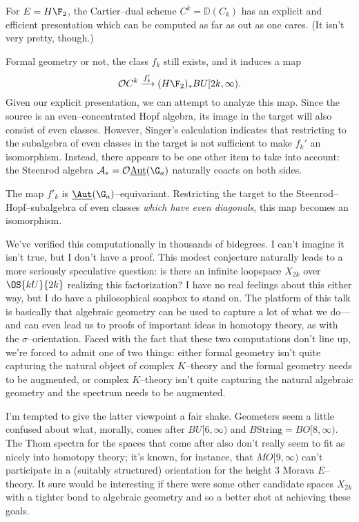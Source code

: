 \begin{theorem}
For $E = H\F_2$, the Cartier--dual scheme $C^k = \mathbb{D}(C_k)$ has an explicit and efficient presentation which can be computed as far as out as one cares.  (It isn't very pretty, though.)
\end{theorem}

Formal geometry or not, the class $f_k$ still exists, and it induces a map \[\mathcal{O} C^k \xrightarrow{f_k'} (H\F_2)_* BU[2k, \infty).\]  Given our explicit presentation, we can attempt to analyze this map.  Since the source is an even--concentrated Hopf algebra, its image in the target will also consist of even classes.  However, Singer's calculation indicates that restricting to the subalgebra of even classes in the target is not sufficient to make $f_k'$ an isomorphism.  Instead, there appears to be one other item to take into account: the Steenrod algebra $\mathcal{A}_* = \mathcal{O} \underline{\operatorname{Aut}}(\G_a)$ naturally coacts on both sides.

\begin{conjecture}
The map $f'_k$ is $\underline{\Aut}(\G_a)$--equivariant.  Restricting the target to the Steenrod--Hopf--subalgebra of even classes \emph{which have even diagonals}, this map becomes an isomorphism.
\end{conjecture}

\noindent We've verified this computationally in thousands of bidegrees.  I can't imagine it isn't true, but I don't have a proof.  This modest conjecture naturally leads to a more seriously speculative question: is there an infinite loopspace $X_{2k}$ over $\OS{kU}{2k}$ realizing this factorization?  I have no real feelings about this either way, but I do have a philosophical soapbox to stand on.  The platform of this talk is basically that algebraic geometry can be used to capture a lot of what we do---and can even lead us to proofs of important ideas in homotopy theory, as with the $\sigma$--orientation.  Faced with the fact that these two computations don't line up, we're forced to admit one of two things: either formal geometry isn't quite capturing the natural object of complex $K$--theory and the formal geometry needs to be augmented, or complex $K$--theory isn't quite capturing the natural algebraic geometry and the spectrum needs to be augmented.

I'm tempted to give the latter viewpoint a fair shake.  Geometers seem a little confused about what, morally, comes after $BU[6, \infty)$ and $B\mathrm{String} = BO[8, \infty)$.  The Thom spectra for the spaces that come after also don't really seem to fit as nicely into homotopy theory; it's known, for instance, that $MO[9, \infty)$ can't participate in a (suitably structured) orientation for the height $3$ Morava $E$--theory.  It sure would be interesting if there were some other candidate spaces $X_{2k}$ with a tighter bond to algebraic geometry and so a better shot at achieving these goals.

